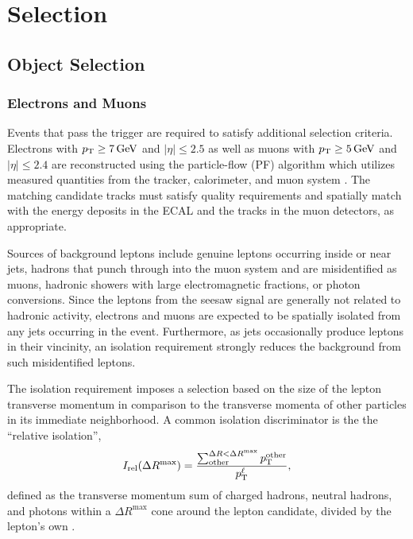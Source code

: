 \chapter{Selection}
\label{chap:Selection}

\section{Object Selection}
\label{sec:Selection/Object}

\subsection{Electrons and Muons}
Events that pass the trigger are required to satisfy additional selection criteria. Electrons with $p_{\mathrm{T}} \geq 7\,\text{Ge\hspace{-.08em}V}$ and $|\eta| \leq 2.5$ as well as muons with $p_{\mathrm{T}} \geq 5\,\text{Ge\hspace{-.08em}V}$ and $|\eta| \leq 2.4$ are reconstructed using the particle-flow (PF) algorithm which utilizes measured quantities from the tracker, calorimeter, and muon system \cite{CMS-PAS-PFT-09-001}. The matching candidate tracks must satisfy quality requirements and spatially match with the energy deposits in the ECAL and the tracks in the muon detectors, as appropriate.

Sources of background leptons include genuine leptons occurring inside or near jets, hadrons that punch through into the muon system and are misidentified as muons, hadronic showers with large electromagnetic fractions, or photon conversions. Since the leptons from the seesaw signal are generally not related to hadronic activity, electrons and muons are expected to be spatially isolated from any jets occurring in the event. Furthermore, as jets occasionally produce leptons in their vincinity, an isolation requirement strongly reduces the background from such misidentified leptons.

The isolation requirement imposes a selection based on the size of the lepton transverse momentum in comparison to the transverse momenta of other particles in its immediate neighborhood. A common isolation discriminator is the the ``relative isolation'',
\begin{equation}
	I_\text{rel}(\Delta R^\textrm{max}) = \frac{\sum_\text{other}^{\Delta R < \Delta R^\textrm{max}} p_{\mathrm{T}}^\text{other}}{p_{\mathrm{T}}^\ell},
\end{equation}
defined as the transverse momentum sum of charged hadrons, neutral hadrons, and photons within a $\Delta R^\textrm{max}$ cone around the lepton candidate, divided by the lepton's own \pt.

